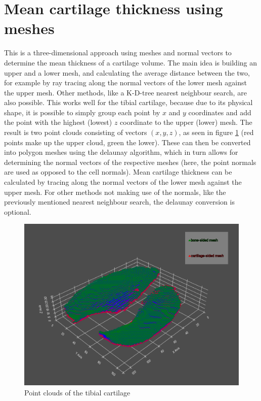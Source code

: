 \section{Mean cartilage thickness using meshes}
\label{sec:Meshes}
This is a three-dimensional approach using meshes and normal vectors to determine the mean thickness of a cartilage volume. The main idea is building an upper and a lower mesh, and calculating the average distance between the two, for example by ray tracing along the normal vectors of the lower mesh against the upper mesh. Other methods, like a K-D-tree nearest neighbour search, are also possible. This works well for the tibial cartilage, because due to its physical shape, it is possible to simply group each point by $x$ and $y$ coordinates and add the point with the highest (lowest) $z$ coordinate to the upper (lower) mesh. The result is two point clouds consisting of vectors $(x, y, z)$, as seen in figure \ref{fig:tibial_point_cloud} (red points make up the upper cloud, green the lower). These can then be converted into polygon meshes using the delaunay algorithm, which in turn allows for determining the normal vectors of the respective meshes (here, the point normals are used as opposed to the cell normals). Mean cartilage thickness can be calculated by tracing along the normal vectors of the lower mesh against the upper mesh. For other methods not making use of the normals, like the previously mentioned nearest neighbour search, the delaunay conversion is optional. 
\begin{figure}[htb!]
	\centering
	\includegraphics[width=\linewidth]{./figures/tibial_points}
	\caption{Point clouds of the tibial cartilage}
	\label{fig:tibial_point_cloud}
\end{figure}
